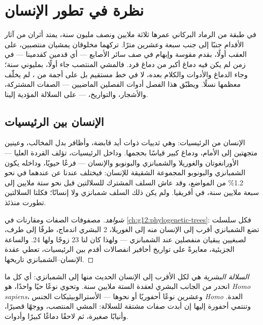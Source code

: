 \chapter{نظرة في تطور الإنسان}\label{ch:g12:human-evolution}

في طبقة من الرماد البركاني عمرها ثلاثة ملايين ونصف مليون سنة، يمتد
أثران من آثار الأقدام جنبًا إلى جنب سبعة وعشرين مترًا. تركهما مخلوقان
يمشيان منتصبين، على العقب أولًا، بقدم مقوسة وإبهام في صف سائر الأصابع
--- أي قدمين كقدمينا --- في زمن لم يكن فيه دماغ أكبر من دماغ قرد.
فالمشي المنتصب جاء أولًا، بمليوني سنة؛ وجاء الدماغ والأدوات والكلام
بعده، لا في خط مستقيم بل على أجمة من ، لم يخلّف معظمها نسلًا.
ويطبّق هذا الفصل أدوات الفصلين الماضيين --- الصفات المشتركة، والأشجار،
والتواريخ،  --- على السلالة المؤدية إلينا.

\section{الإنسان بين الرئيسيات}

\begin{proposition}\label{prop:g12:human-evolution:place}
الإنسان من الرئيسيات: وهي ثدييات ذوات أيد قابضة، وأظافر بدل المخالب،
وعينين متجهتين إلى الأمام، ودماغ كبير قياسًا بحجمها. وداخل الرئيسيات،
تؤلف القردة العليا --- الأورانغوتان والغوريلا والشمبانزي والبونوبو
والإنسان --- فرعًا حيويًا، وداخله يكون الشمبانزي والبونوبو المجموعة
الشقيقة للإنسان: فيختلف  عندنا عن  عندهما في نحو 1.2\% من
المواضع، وقد عاش السلف المشترك للسلالتين قبل نحو ستة ملايين إلى سبعة
ملايين سنة، في أفريقيا. ولم يكن ذلك السلف شمبانزي ولا إنسانًا؛ فكلتا
السلالتين تطورت منذئذ.
\end{proposition}
\begin{proof}[شواهد]
مصفوفات الصفات ومقارنات  في \cref{ch:g12:phylogenetic-trees}: فكل
 سلسلت تضع الشمبانزي أقرب إلى الإنسان منه إلى الغوريلا، 
2 البشري اندماج، طرفًا إلى طرف، لصبغيين يبقيان منفصلين عند الشمبانزي
--- ولهذا كان لنا 23 زوجًا ولها 24. والساعة الجزيئية، معايرةً على
تواريخ أحافير انفصالات أقدم بين الرئيسيات، تعطي عقدة الإنسان--الشمبانزي
تاريخها.
\end{proof}

\begin{definition}\label{def:g12:human-evolution:lineage}
\emph{السلالة البشرية} هي  لكل 
الأقرب إلى الإنسان الحديث منها إلى الشمبانزي: أي كل ما انحدر من الجانب
البشري لعقدة الستة ملايين سنة. وتحوي نوعًا حيًا واحدًا، هو \emph{Homo
sapiens}، وعشرين نوعًا أحفوريًا أو نحوها --- الأسترالوبيثيكات 
الجنس \emph{Homo} العدة. وتنتمي أحفورة إليها إن أبدت صفات مشتقة
للسلالة: المشي المنتصب، ووجهًا قصيرًا، وأنيابًا صغيرة، ثم لاحقًا دماغًا
كبيرًا وأدوات.
\end{definition}

